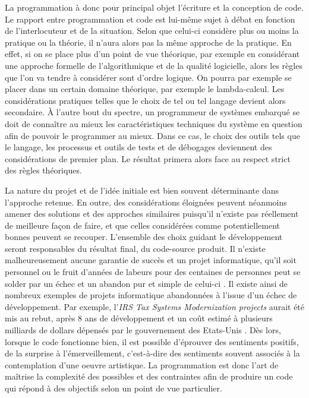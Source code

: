 \documentclass[12pt]{article} %
\begin{document}
La programmation à donc pour principal objet l'écriture et la conception de code. Le rapport entre programmation et code est lui-même sujet à débat en fonction de l'interlocuteur et de la situation. Selon que celui-ci considère plus ou moins la pratique ou la théorie, il n'aura alors pas la même approche de la pratique. En effet, si on se place plus d'un point de vue théorique, par exemple en considérant une approche formelle de l'algorithmique et de la qualité logicielle, alors les règles que l'on va tendre à considérer sont d'ordre logique. On pourra par exemple se placer dans un certain domaine théorique, par exemple le lambda-calcul. Les considérations pratiques telles que le choix de tel ou tel langage devient alors secondaire. À l'autre bout du spectre, un programmeur de systèmes embarqué se doit de connaître au mieux les caractéristiques techniques du système en question afin de pouvoir le programmer au mieux. Dans ce cas, le choix des outils tels que le langage, les processus et outils de tests et de débogages deviennent des considérations de premier plan. Le résultat primera alors face au respect strict des règles théoriques. 

La nature du projet et de l'idée initiale est bien souvent déterminante dans l'approche retenue. En outre, des considérations éloignées peuvent néanmoins amener des solutions et des approches similaires puisqu'il n'existe pas réellement de meilleure façon de faire, et que celles considérées comme potentiellement bonnes peuvent se recouper. L'ensemble des choix guidant le développement seront responsables du résultat final, du code-source produit. Il n'existe malheureusement aucune garantie de succès et un projet informatique, qu'il soit personnel ou le fruit d'années de labeurs pour des centaines de personnes peut se solder par un échec et un abandon pur et simple de celui-ci \cite{Wikipedia-failedComputerProjects} \cite{YBar-Yam2003}. Il existe ainsi de nombreux exemples de projets informatique abandonnées à l'issue d'un échec de développement. Par exemple, l'\textit{IRS Tax Systems Modernization projects} aurait été mis au rebut, après 8 ans de développement et un coût estimé à plusieurs milliards de dollars dépensés par le gouvernement des Etats-Unis \cite{GDobocan2020}. Dès lors, lorsque le code fonctionne bien, il est possible d'éprouver des sentiments positifs, de la surprise à l'émerveillement, c'est-à-dire des sentiments souvent associés à la contemplation d'une oeuvre artistique. La programmation est donc l'art de maîtrise la complexité des possibles et des contraintes afin de produire un code qui répond à des objectifs selon un point de vue particulier.
\end{document}
